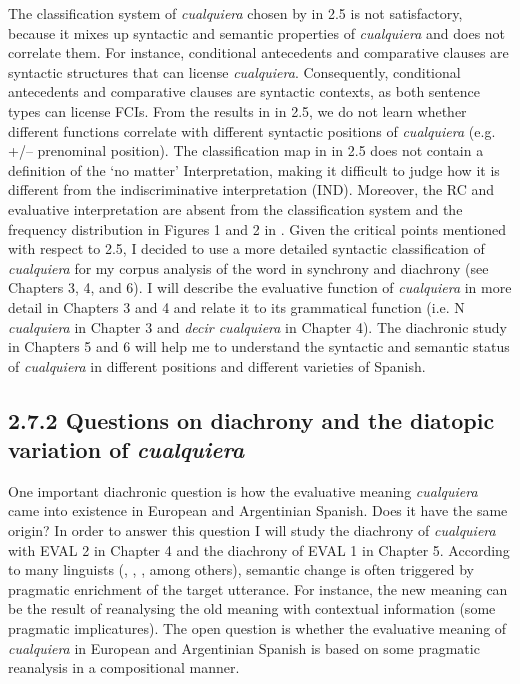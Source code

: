   The classification system of \textit{cualquiera} chosen by \citet{AloniEtAl2010} in 2.5 is not satisfactory, because it mixes up syntactic and semantic properties of \textit{cualquiera} and does not correlate them. For instance, conditional antecedents and comparative clauses are syntactic structures that can license \textit{cualquiera}. Consequently, conditional antecedents and comparative clauses are syntactic contexts, as both sentence types can license FCIs. From the results in  in 2.5, we do not learn whether different functions correlate with different syntactic positions of \textit{cualquiera} (e.g. +/– prenominal position). The classification map in  in 2.5 does not contain a definition of the ‘no matter’ Interpretation, making it difficult to judge how it is different from the indiscriminative interpretation (IND). Moreover, the RC and evaluative interpretation are absent from the classification system and the frequency distribution in Figures 1 and 2 in . Given the critical points mentioned with respect to 2.5, I decided to use a more detailed syntactic classification of \textit{cualquiera} for my corpus analysis of the word in synchrony and diachrony (see Chapters 3, 4, and 6). I will describe the evaluative function of \textit{cualquiera} in more detail in Chapters 3 and 4 and relate it to its grammatical function (i.e. N \textit{cualquiera} in Chapter 3 and \textit{decir cualquiera} in Chapter 4). The diachronic study in Chapters 5 and 6 will help me to understand the syntactic and semantic status of \textit{cualquiera} in different positions and different varieties of Spanish. 

\subsection{\textbf{2.7.2} \textbf{Questions} \textbf{on} \textbf{diachrony} \textbf{and} \textbf{the} \textbf{diatopic} \textbf{variation} \textbf{of} \textbf{\textit{cualquiera}}}

One important diachronic question is how the evaluative meaning \textit{cualquiera} came into existence in European and Argentinian Spanish. Does it have the same origin? In order to answer this question I will study the diachrony of \textit{cualquiera} with EVAL 2 in Chapter 4 and the diachrony of EVAL 1 in Chapter 5. According to many linguists (\citealt{Blank1997}, \citealt{Traugott1989}, \citealt{Eckardt2006}, among others), semantic change is often triggered by pragmatic enrichment of the target utterance. For instance, the new meaning can be the result of reanalysing the old meaning with contextual information (some pragmatic implicatures). The open question is whether the evaluative meaning of \textit{cualquiera} in European and Argentinian Spanish is based on some pragmatic reanalysis in a compositional manner. 

